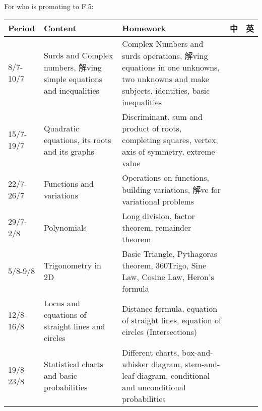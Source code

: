 \documentclass{article}
\begin{document}
    For who is promoting to F.5:
    \begin{center}
        \begin{tabular}{|m{2cm}|m{6cm}|m{6cm}|m{1cm}|m{1cm}|}
            \hline
            Period&Content&Homework&中&英\\
            \hline
            8/7-10/7&Surds and Complex numbers, 解ving simple equations and inequalities&Complex Numbers and surds operations, 解ving equations in one unknowns, two unknowns and make subjects, identities, basic inequalities&&\\
            \hline
            15/7-19/7&Quadratic equations, its roots and its graphs&Discriminant, sum and product of roots, completing squares, vertex, axis of symmetry, extreme value&&\\
            \hline
            22/7-26/7&Functions and variations&Operations on functions, building variations, 解ve for variational problems&&\\
            \hline
            29/7-2/8&Polynomials&Long division, factor theorem, remainder theorem&&\\
            \hline
            5/8-9/8&Trigonometry in 2D&Basic Triangle, Pythagoras theorem, 360Trigo, Sine Law, Cosine Law, Heron's formula&&\\
            \hline
            12/8-16/8&Locus and equations of straight lines and circles&Distance formula, equation of straight lines, equation of circles (Intersections)&&\\
            \hline
            19/8-23/8&Statistical charts and basic probabilities& Different charts, box-and-whisker diagram, stem-and-leaf diagram, conditional and unconditional probabilities&&\\
            \hline
        \end{tabular}
    \end{center}

    \pagebreak
\end{document}
